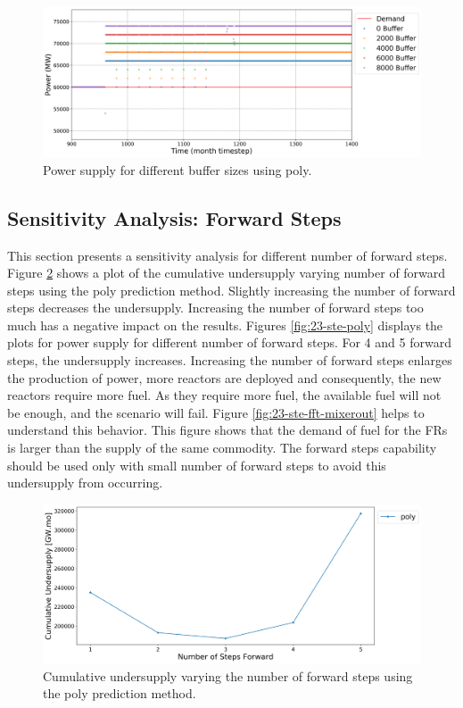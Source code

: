 \documentclass[11pt]{article}
\begin{document}
\begin{figure}[H]
	\centering
	\includegraphics[width=\textwidth]{23-figures/23-power-buffer-poly.png} 
	\hfill
	\caption{Power supply for different buffer sizes using poly.}
	\label{fig:23-buf-poly}
\end{figure}

\subsection{Sensitivity Analysis: Forward Steps}

This section presents a sensitivity analysis for different number of forward steps.
Figure \ref{fig:23-steps} shows a plot of the cumulative undersupply 
varying number of forward steps using the poly prediction method.
Slightly increasing the number of forward steps decreases the undersupply. 
Increasing the number of forward steps too much has a negative impact on the results.
Figures \ref{fig:23-ste-poly} displays the plots for power supply for different 
number of forward steps. For 4 and 5 forward steps, the undersupply increases.
Increasing the number of forward steps enlarges the production of power, 
more reactors are deployed and consequently, the new reactors require more fuel. 
As they require more fuel, the available fuel will not be enough,
and the scenario will fail. 
Figure \ref{fig:23-ste-fft-mixerout} helps to understand this behavior. 
This figure shows that the demand of fuel for the FRs is larger than the 
supply of the same commodity.
The forward steps capability should be used only with small number of forward steps 
to avoid this undersupply from occurring. 

\begin{figure}[H]
	\centering
	\includegraphics[width=\textwidth]{23-figures/23-sens-steps.png} 
	\hfill
	\caption{Cumulative undersupply varying the number of forward steps using the poly prediction method.}
	\label{fig:23-steps}
\end{figure}
\end{document}
